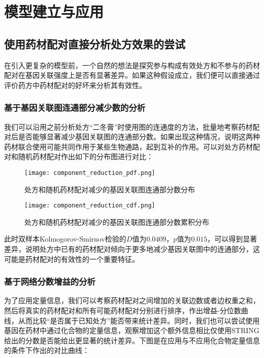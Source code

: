
\chapter{模型建立与应用}

\section{使用药材配对直接分析处方效果的尝试}

在引入更复杂的模型前，一个自然的想法是探究参与构成有效处方和不参与的药材配对在基因关联强度上是否有显著差异。如果这种假设成立，我们便可以直接通过评价药方中药材配对的好坏来分析其有效性。

\subsection{基于基因关联图连通部分减少数的分析}

我们可以沿用之前分析处方“二冬膏”时使用图的连通度的方法，批量地考察药材配对后是否能够显著减少基因关联图的连通部分数。如果出现这种情况，说明这两种药材联合使用可能共同作用于某些生物通路，起到互补的作用。可以对处方药材配对和随机药材配对作出如下的分布图进行对比：

\begin{figure}[H]
  \centering
  \texttt{[image: component\_reduction\_pdf.png]}
  \caption{处方和随机药材配对减少的基因关联图连通部分数分布}
  \label{fig:component_reduction_pdf}
\end{figure}

\begin{figure}[H]
  \centering
  \texttt{[image: component\_reduction\_cdf.png]}
  \caption{处方和随机药材配对减少的基因关联图连通部分数累积分布}
  \label{fig:component_reduction_cdf}
\end{figure}

此时双样本Kolmogorov-Smirnov检验的$D$值为$0.0409$，$p$值为$0.015$，可以得到显著差异，说明处方中已有的药材配对倾向于更多地减少基因关联图中的连通部分，这可能是药材配对的有效性的一个重要特征。

\subsection{基于网络分数增益的分析}


为了应用定量信息，我们可以考察药材配对之间增加的关联边数或者边权重之和，然后将真实的药材配对和所有可能药材配对分别进行排序，作出增益-分位数曲线，从而比较“是否属于已知处方”能否带来统计差异。同时，我们也可以尝试使用基因在药材中通过化合物的定量信息，观察增加这个额外信息相比仅使用STRING给出的分数是否能给出更显著的统计差异。下图是在应用与不应用化合物定量信息的条件下作出的对比曲线：

